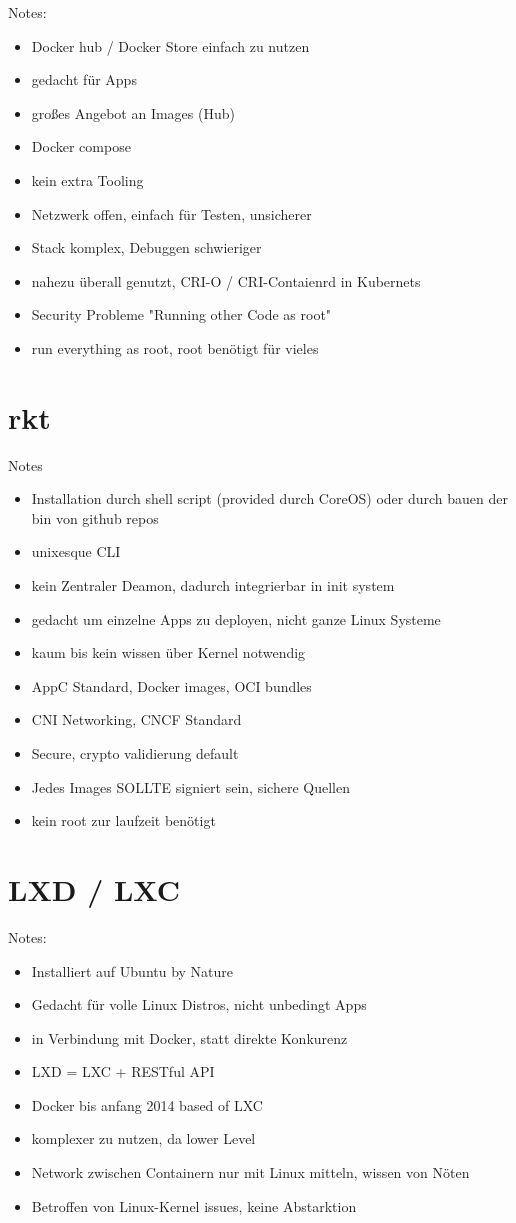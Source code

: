 Notes:
\begin{itemize}
	\item Docker hub / Docker Store einfach zu nutzen
	\item gedacht für Apps
	\item großes Angebot an Images (Hub)
	\item Docker compose
	\item kein extra Tooling
	\item Netzwerk offen, einfach für Testen, unsicherer
	\item Stack komplex, Debuggen schwieriger
	\item nahezu überall genutzt, CRI-O / CRI-Contaienrd in Kubernets
	\item Security Probleme "Running other Code as root"
	\item run everything as root, root benötigt für vieles
\end{itemize}

\section{rkt}
\label{sec:compRkt}
Notes
\begin{itemize}
	\item Installation durch shell script (provided durch CoreOS) oder durch bauen der bin von github repos
	\item unixesque CLI
	\item kein Zentraler Deamon, dadurch integrierbar in init system
	\item gedacht um einzelne Apps zu deployen, nicht ganze Linux Systeme
	\item kaum bis kein wissen über Kernel notwendig
	\item AppC Standard, Docker images, OCI bundles
	\item CNI Networking, CNCF Standard
	\item Secure, crypto validierung default
	\item Jedes Images SOLLTE signiert sein, sichere Quellen
	\item kein root zur laufzeit benötigt
\end{itemize}

\section{LXD / LXC}
\label{sec:compLXD}
Notes:
\begin{itemize}
	\item Installiert auf Ubuntu by Nature
	\item Gedacht für volle Linux Distros, nicht unbedingt Apps
	\item in Verbindung mit Docker, statt direkte Konkurenz
	\item LXD = LXC + RESTful API
	\item Docker bis anfang 2014 based of LXC
	\item komplexer zu nutzen, da lower Level
	\item Network zwischen Containern nur mit Linux mitteln, wissen von Nöten
	\item Betroffen von Linux-Kernel issues, keine Abstarktion
\end{itemize}

